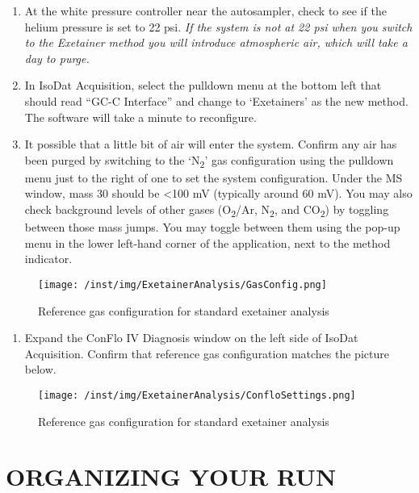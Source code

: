 \documentclass[]{article}
\providecommand{\tightlist}{%
  \setlength{\itemsep}{0pt}\setlength{\parskip}{0pt}}
\begin{document}
\begin{enumerate}
\def\labelenumi{\arabic{enumi}.}
\tightlist
\item
  At the white pressure controller near the autosampler, check to see if
  the helium pressure is set to 22 psi. \emph{If the system is not at 22
  psi when you switch to the Exetainer method you will introduce
  atmospheric air, which will take a day to purge.}\\
\item
  In IsoDat Acquisition, select the pulldown menu at the bottom left
  that should read ``GC-C Interface'' and change to `Exetainers' as the
  new method. The software will take a minute to reconfigure.\\
\item
  It possible that a little bit of air will enter the system. Confirm
  any air has been purged by switching to the `N\textsubscript{2}' gas
  configuration using the pulldown menu just to the right of one to set
  the system configuration. Under the MS window, mass 30 should be
  \textless{}100 mV (typically around 60 mV). You may also check
  background levels of other gases (O\textsubscript{2}/Ar,
  N\textsubscript{2}, and CO\textsubscript{2}) by toggling between those
  mass jumps. You may toggle between them using the pop-up menu in the
  lower left-hand corner of the application, next to the method
  indicator.
\end{enumerate}

\begin{figure}
\centering
\texttt{[image: /inst/img/ExetainerAnalysis/GasConfig.png]}
\caption{Reference gas configuration for standard exetainer analysis}
\end{figure}

\begin{enumerate}
\def\labelenumi{\arabic{enumi}.}
\setcounter{enumi}{3}
\tightlist
\item
  Expand the ConFlo IV Diagnosis window on the left side of IsoDat
  Acquisition. Confirm that reference gas configuration matches the
  picture below.
\end{enumerate}

\begin{figure}
\centering
\texttt{[image: /inst/img/ExetainerAnalysis/ConfloSettings.png]}
\caption{Reference gas configuration for standard exetainer analysis}
\end{figure}

\section{ORGANIZING YOUR RUN}\label{organizing-your-run}
\end{document}

